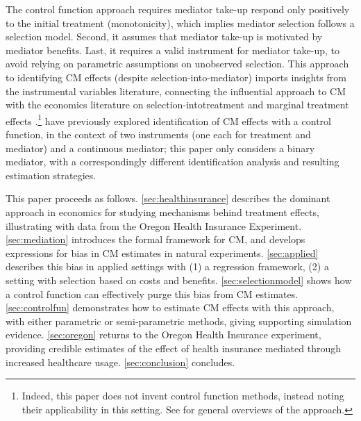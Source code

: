 The control function approach requires mediator take-up respond only positively to the initial treatment (monotonicity), which implies mediator selection follows a selection model.
Second, it assumes that mediator take-up is motivated by mediator benefits.
Last, it requires a valid instrument for mediator take-up, to avoid relying on parametric assumptions on unobserved selection.
This approach to identifying CM effects (despite selection-into-mediator) imports insights from the instrumental variables literature, connecting the influential \cite{imai2010identification} approach to CM with the economics literature on selection-intotreatment and marginal treatment effects \citep{vytlacil2002independence,heckman2004using,heckman2005structural,florens2008identification,kline2019heckits}.\footnote{
    Indeed, this paper does not invent control function methods, instead noting their applicability in this setting.
    See \cite{wooldridge2015control,imbens2007nonadditive} for general overviews of the approach.
}
\cite{frolich2017direct} have previously explored identification of CM effects with a control function, in the context of two instruments (one each for treatment and mediator) and a continuous mediator; this paper only considers a binary mediator, with a correspondingly different identification analysis and resulting estimation strategies.

This paper proceeds as follows.
\autoref{sec:healthinsurance} describes the dominant approach in economics for studying mechanisms behind treatment effects, illustrating with data from the Oregon Health Insurance Experiment.
\autoref{sec:mediation} introduces the formal framework for CM, and develops expressions for bias in CM estimates in natural experiments.
\autoref{sec:applied} describes this bias in applied settings with (1) a regression framework, (2) a setting with selection based on costs and benefits.
\autoref{sec:selectionmodel} shows how a control function can effectively purge this bias from CM estimates.
\autoref{sec:controlfun} demonstrates how to estimate CM effects with this approach, with either parametric or semi-parametric methods, giving supporting simulation evidence.
\autoref{sec:oregon} returns to the Oregon Health Insurance experiment, providing credible estimates of the effect of health insurance mediated through increased healthcare usage.
\autoref{sec:conclusion} concludes.
